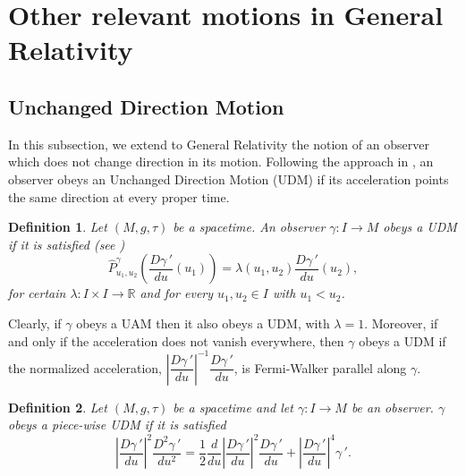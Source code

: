 \documentclass[11pt]{book}
\newtheorem{defi}{Definition}[chapter]
\def\R{\mathbb R}
\begin{document}
\section{Other relevant motions in General Relativity}\label{Other motions}
\subsection{Unchanged Direction Motion}
In this subsection, we extend to General Relativity the notion of an observer which does not change direction in its motion. Following the approach in \cite{UDM}, an observer obeys an Unchanged Direction Motion (UDM) if its acceleration points the same direction at every proper time.
\begin{defi}\label{UDM_def}
	Let $(M,g,\tau)$ be a spacetime. An observer $\gamma:I\to M$ obeys a UDM if it is satisfied (see \cite{UDM})
	\begin{equation}
		\widehat{P}_{u_1,u_2}^\gamma \left(\dfrac{D\gamma{\,'}}{du}(u_1)\right) = \lambda(u_1,u_2) \dfrac{D\gamma{\,'}}{du}(u_2),
	\end{equation}
	for certain $\lambda:I\times I\to \R$ and for every $u_1,u_2\in I$ with $u_1<u_2$.
\end{defi}

Clearly, if $\gamma$ obeys a UAM then it also obeys a UDM, with $\lambda=1$. Moreover, if and only if the acceleration does not vanish everywhere, then $\gamma$ obeys a UDM if the normalized acceleration, $\left|\dfrac{D\gamma{\,'}}{du}\right|^{-1}\dfrac{D\gamma{\,'}}{du}$, is Fermi-Walker parallel along $\gamma$. 

\begin{defi}\label{piece-wise}
	Let $(M,g,\tau)$ be a spacetime and let $\gamma:I\to M$ be an observer. 
	$\gamma$ obeys a piece-wise UDM if it is satisfied
	\begin{equation}\label{UDM}
		\left|\dfrac{D\gamma{\,'}}{du}\right|^2\dfrac{D^2\gamma{\,'}}{du^2}=\dfrac{1}{2}\dfrac{d}{du}\left|\dfrac{D\gamma{\,'}}{du}\right|^2\dfrac{D\gamma{\,'}}{du}+\left|\dfrac{D\gamma{\,'}}{du}\right|^4\gamma{\,'}.
	\end{equation}
\end{defi}
\end{document}
